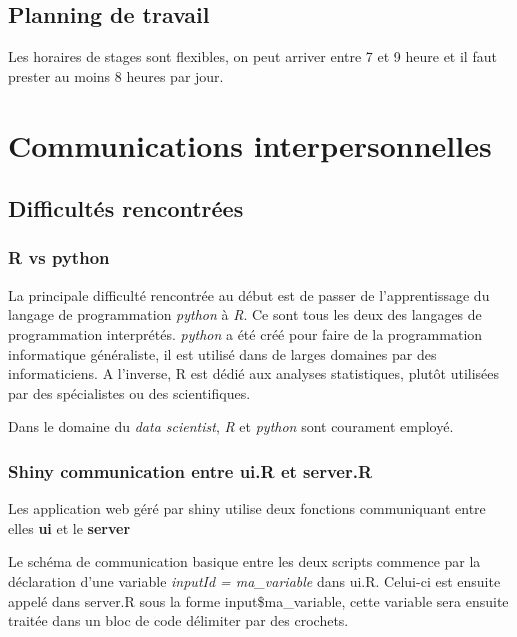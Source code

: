 \documentclass[]{report}
\begin{document}
\section{Planning de travail}\label{planning-de-travail}

Les horaires de stages sont flexibles, on peut arriver entre 7 et 9
heure et il faut prester au moins 8 heures par jour.

\chapter{Communications
interpersonnelles}\label{communications-interpersonnelles}

\section{Difficultés rencontrées}\label{difficultes-rencontrees}

\subsection{R vs python}\label{r-vs-python}

La principale difficulté rencontrée au début est de passer de
l'apprentissage du langage de programmation \emph{python} à \emph{R}. Ce
sont tous les deux des langages de programmation interprétés.
\emph{python} a été créé pour faire de la programmation informatique
généraliste, il est utilisé dans de larges domaines par des
informaticiens. A l'inverse, R est dédié aux analyses statistiques,
plutôt utilisées par des spécialistes ou des scientifiques.

Dans le domaine du \emph{data scientist}, \emph{R} et \emph{python} sont
courament employé.

\subsection{Shiny communication entre ui.R et
server.R}\label{shiny-communication-entre-ui.r-et-server.r}

Les application web géré par shiny utilise deux fonctions communiquant
entre elles \textbf{ui} et le \textbf{server}

Le schéma de communication basique entre les deux scripts commence par
la déclaration d'une variable \emph{inputId = ma\_variable} dans ui.R.
Celui-ci est ensuite appelé dans server.R sous la forme
input\$ma\_variable, cette variable sera ensuite traitée dans un bloc de
code délimiter par des crochets.
\end{document}
